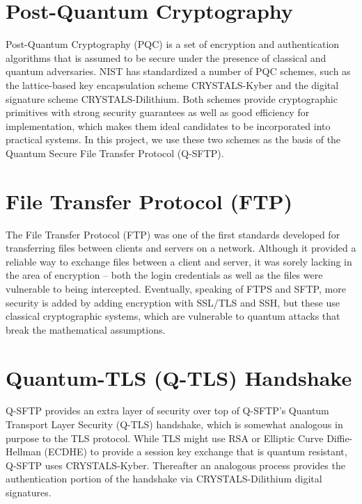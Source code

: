 \section{Post-Quantum Cryptography}

Post-Quantum Cryptography (PQC) is a set of encryption and authentication algorithms that is assumed to be secure under the presence of classical and quantum adversaries. NIST has standardized a number of PQC schemes, such as the lattice-based key encapsulation scheme CRYSTALS-Kyber and the digital signature scheme CRYSTALS-Dilithium. Both schemes provide cryptographic primitives with strong security guarantees as well as good efficiency for implementation, which makes them ideal candidates to be incorporated into practical systems. In this project, we use these two schemes as the basis of the Quantum Secure File Transfer Protocol (Q-SFTP).

\section{File Transfer Protocol (FTP)}

The File Transfer Protocol (FTP) was one of the first standards developed for transferring files between clients and servers on a network. Although it provided a reliable way to exchange files between a client and server, it was sorely lacking in the area of encryption -- both the login credentials as well as the files were vulnerable to being intercepted.
Eventually, speaking of FTPS and SFTP, more security is added by adding encryption with SSL/TLS and SSH, but these use classical cryptographic systems, which are vulnerable to quantum attacks that break the mathematical assumptions.


\section{Quantum-TLS (Q-TLS) Handshake}

Q-SFTP provides an extra layer of security over top of Q-SFTP’s Quantum Transport Layer Security (Q-TLS) handshake, which is somewhat analogous in purpose to the TLS protocol. While TLS might use RSA or Elliptic Curve Diffie-Hellman (ECDHE) to provide a session key exchange that is quantum resistant, Q-SFTP uses CRYSTALS-Kyber. Thereafter an analogous process provides the authentication portion of the handshake via CRYSTALS-Dilithium digital signatures.
